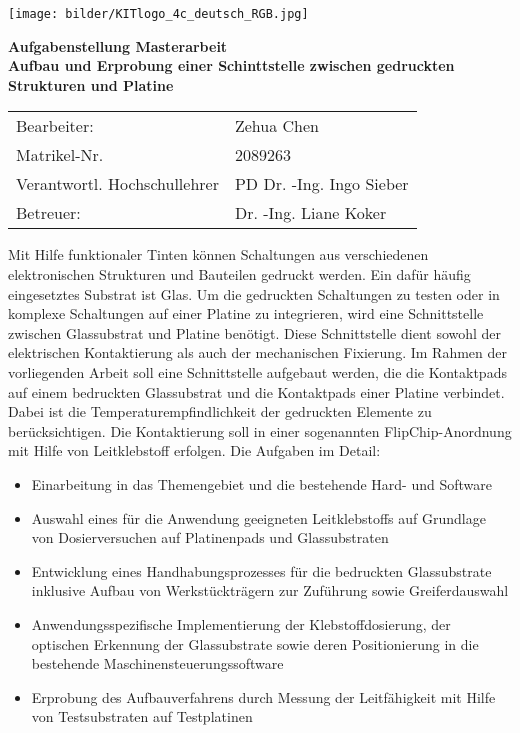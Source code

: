 \thispagestyle{empty}
\texttt{[image: bilder/KITlogo\_4c\_deutsch\_RGB.jpg]}
\begin{center}
\huge
\textbf{Aufgabenstellung Masterarbeit}\\
\Large
\vskip 1cm
\textbf{ \textsf{Aufbau und Erprobung einer Schinttstelle zwischen gedruckten Strukturen und Platine} }
\normalsize
\begin{tabular}{ll}
\\
Bearbeiter:   & Zehua Chen\\
Matrikel-Nr.  &2089263\\
Verantwortl. Hochschullehrer  & PD Dr. -Ing. Ingo Sieber\\
Betreuer:    & Dr. -Ing. Liane Koker\\
\end{tabular}
\end{center}

\normalsize
Mit Hilfe funktionaler Tinten können Schaltungen aus verschiedenen elektronischen Strukturen und Bauteilen gedruckt werden. Ein dafür häufig eingesetztes Substrat ist Glas. Um die gedruckten Schaltungen zu testen oder in komplexe Schaltungen auf einer Platine zu integrieren, wird eine Schnittstelle zwischen Glassubstrat und Platine benötigt. Diese Schnittstelle dient sowohl der elektrischen Kontaktierung als auch der mechanischen Fixierung. Im Rahmen der vorliegenden Arbeit soll eine Schnittstelle aufgebaut werden, die die Kontaktpads auf einem bedruckten Glassubstrat und die Kontaktpads einer Platine verbindet. Dabei ist die Temperaturempfindlichkeit der gedruckten Elemente zu berücksichtigen. Die Kontaktierung soll in einer sogenannten FlipChip-Anordnung mit Hilfe von Leitklebstoff erfolgen.
Die Aufgaben im Detail:
\begin{itemize}
\item Einarbeitung in das Themengebiet und die bestehende Hard- und Software
\item Auswahl eines für die Anwendung geeigneten Leitklebstoffs auf Grundlage von Dosierversuchen auf Platinenpads und Glassubstraten
\item Entwicklung eines Handhabungsprozesses für die bedruckten Glassubstrate inklusive Aufbau von Werkstückträgern zur Zuführung sowie Greiferdauswahl
\item Anwendungsspezifische Implementierung der Klebstoffdosierung, der optischen Erkennung der Glassubstrate sowie deren Positionierung in die bestehende Maschinensteuerungssoftware
\item Erprobung des Aufbauverfahrens durch Messung der Leitfähigkeit mit Hilfe von Testsubstraten auf Testplatinen
\end{itemize}

\vskip 1cm
\clearpage